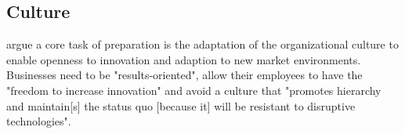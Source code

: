 \subsection{Culture}
\citeauthor{hammer:2015, LucasJr200946} argue a core task of preparation is the adaptation of the organizational culture to enable openness to innovation and adaption to new market environments. Businesses need to be "results-oriented", allow their employees to have the "freedom to increase innovation"\cite{hammer:2015} and avoid a culture that "promotes hierarchy and maintain[s] the status quo [because it] will be resistant to disruptive technologies"\cite{LucasJr200946}.

